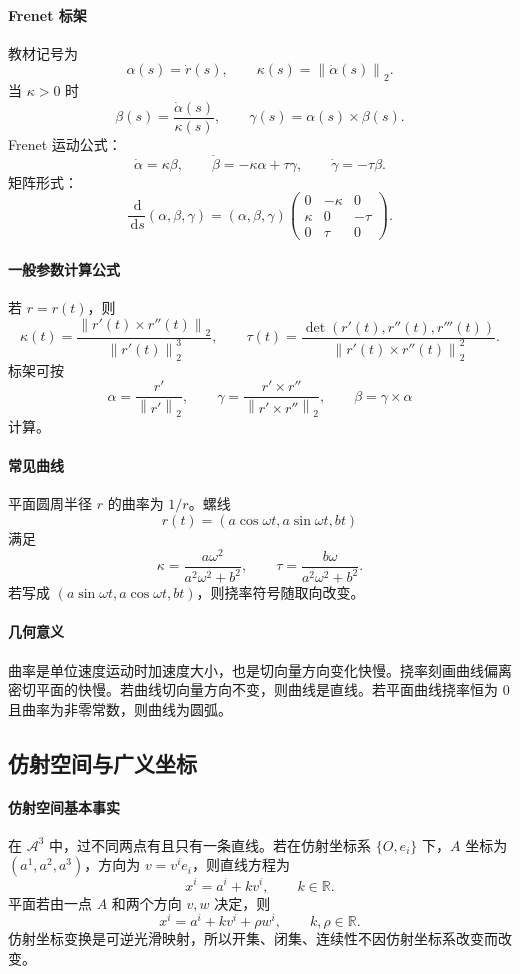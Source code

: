 \documentclass[UTF8,12pt,a4paper]{ctexart}
\newcommand{\A}{\mathcal A}
\newcommand{\R}{\mathbb R}
\newcommand{\dd}{\,\mathrm d}
\newcommand{\norm}[1]{\left\lVert #1\right\rVert}
\begin{document}
\paragraph{Frenet 标架}
教材记号为
\[
\alpha(s)=\dot r(s),\qquad
\kappa(s)=\norm{\dot\alpha(s)}_2.
\]
当 $\kappa>0$ 时
\[
\beta(s)=\frac{\dot\alpha(s)}{\kappa(s)},\qquad
\gamma(s)=\alpha(s)\times\beta(s).
\]
Frenet 运动公式：
\[
\dot\alpha=\kappa\beta,\qquad
\dot\beta=-\kappa\alpha+\tau\gamma,\qquad
\dot\gamma=-\tau\beta.
\]
矩阵形式：
\[
\frac{\dd}{\dd s}(\alpha,\beta,\gamma)
=(\alpha,\beta,\gamma)
\begin{pmatrix}
0&-\kappa&0\\
\kappa&0&-\tau\\
0&\tau&0
\end{pmatrix}.
\]

\paragraph{一般参数计算公式}
若 $r=r(t)$，则
\[
\kappa(t)=\frac{\norm{r'(t)\times r''(t)}_2}{\norm{r'(t)}_2^3},
\qquad
\tau(t)=\frac{\det(r'(t),r''(t),r'''(t))}
{\norm{r'(t)\times r''(t)}_2^2}.
\]
标架可按
\[
\alpha=\frac{r'}{\norm{r'}_2},\qquad
\gamma=\frac{r'\times r''}{\norm{r'\times r''}_2},\qquad
\beta=\gamma\times\alpha
\]
计算。

\paragraph{常见曲线}
平面圆周半径 $r$ 的曲率为 $1/r$。螺线
\[
r(t)=(a\cos\omega t,a\sin\omega t,bt)
\]
满足
\[
\kappa=\frac{a\omega^2}{a^2\omega^2+b^2},\qquad
\tau=\frac{b\omega}{a^2\omega^2+b^2}.
\]
若写成 $(a\sin\omega t,a\cos\omega t,bt)$，则挠率符号随取向改变。

\paragraph{几何意义}
曲率是单位速度运动时加速度大小，也是切向量方向变化快慢。挠率刻画曲线偏离密切平面的快慢。若曲线切向量方向不变，则曲线是直线。若平面曲线挠率恒为 $0$ 且曲率为非零常数，则曲线为圆弧。

\subsection{仿射空间与广义坐标}
\paragraph{仿射空间基本事实}
在 $\A^3$ 中，过不同两点有且只有一条直线。若在仿射坐标系 $\{O,e_i\}$ 下，$A$ 坐标为 $(a^1,a^2,a^3)$，方向为 $v=v^ie_i$，则直线方程为
\[
x^i=a^i+kv^i,\qquad k\in\R.
\]
平面若由一点 $A$ 和两个方向 $v,w$ 决定，则
\[
x^i=a^i+kv^i+\rho w^i,\qquad k,\rho\in\R.
\]
仿射坐标变换是可逆光滑映射，所以开集、闭集、连续性不因仿射坐标系改变而改变。
\end{document}

